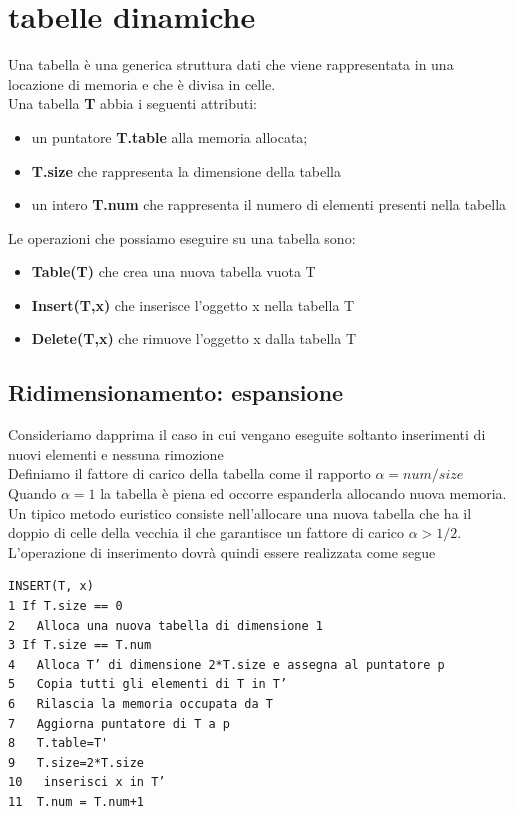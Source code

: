 \section{tabelle dinamiche}
Una tabella è una generica struttura dati che viene rappresentata in una locazione di memoria e che è divisa in celle.\\
Una tabella \textbf{T} abbia i seguenti attributi:\\
\begin{itemize}
    \item un puntatore \textbf{T.table} alla memoria allocata;
    \item \textbf{T.size} che rappresenta la dimensione della tabella
    \item un intero \textbf{T.num} che rappresenta il numero di elementi presenti nella tabella
\end{itemize}
\noindent Le operazioni che possiamo eseguire su una tabella sono:\\
\begin{itemize}
    \item \textbf{Table(T)} che crea una nuova tabella vuota T
    \item \textbf{Insert(T,x)} che inserisce l'oggetto x nella tabella T
    \item \textbf{Delete(T,x)} che rimuove l'oggetto x dalla tabella T
\end{itemize}
\noindent \subsection{Ridimensionamento: espansione}
Consideriamo dapprima il caso in cui vengano eseguite soltanto inserimenti di nuovi elementi e nessuna rimozione\\
Definiamo il fattore di carico della tabella come il rapporto $\alpha = num / size$\\
Quando $\alpha = 1$ la tabella è piena ed occorre espanderla allocando nuova memoria.\\
Un tipico metodo euristico consiste nell'allocare una nuova tabella che ha il doppio di celle della vecchia il che garantisce un fattore di carico $\alpha > 1/2$.\\ 
L'operazione di inserimento dovrà quindi essere realizzata come segue
\begin{verbatim}
INSERT(T, x)
1 If T.size == 0
2   Alloca una nuova tabella di dimensione 1
3 If T.size == T.num
4   Alloca T’ di dimensione 2*T.size e assegna al puntatore p
5   Copia tutti gli elementi di T in T’
6   Rilascia la memoria occupata da T
7   Aggiorna puntatore di T a p
8   T.table=T'
9   T.size=2*T.size
10   inserisci x in T’
11  T.num = T.num+1
\end{verbatim}
